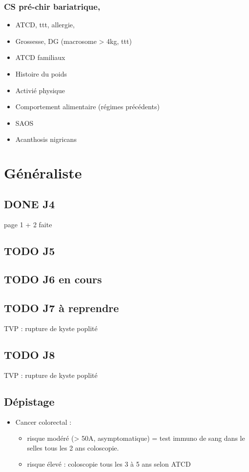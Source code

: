 \documentclass[11pt]{article}
\begin{document}
\subsubsection{CS pré-chir bariatrique,}
\label{sec:org5000b09}
\begin{itemize}
\item ATCD, ttt, allergie,
\item Grossesse, DG (macrosome > 4kg, ttt)
\item ATCD familiaux
\item Histoire du poids
\item Activié physique
\item Comportement alimentaire (régimes précédents)
\item SAOS
\item Acanthosis nigricans
\end{itemize}
\section{Généraliste}
\label{sec:orgb9426bd}
\subsection{{\bfseries\sffamily DONE} J4}
\label{sec:orgc478290}
page 1 + 2 faite
\subsection{{\bfseries\sffamily TODO} J5}
\label{sec:org0397808}
\subsection{{\bfseries\sffamily TODO} J6 en cours}
\label{sec:org65bb54e}
\subsection{{\bfseries\sffamily TODO} J7  à reprendre}
\label{sec:orgcd24470}
TVP : rupture de kyste poplité
\subsection{{\bfseries\sffamily TODO} J8}
\label{sec:org4c24c01}
TVP : rupture de kyste poplité
\subsection{Dépistage}
\label{sec:org89e9210}
\begin{itemize}
\item Cancer colorectal : 
\begin{itemize}
\item risque modéré (> 50A, asymptomatique) = test immuno de sang dans le selles tous les 2 ans \textpm{} coloscopie.
\item risque élevé : coloscopie tous les 3 à 5 ans selon ATCD
\end{itemize}
\end{itemize}
\end{document}
